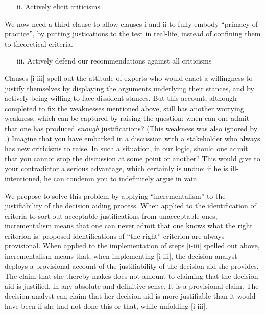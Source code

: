 \documentclass[preprint, french, english, 11pt, authoryear]{elsarticle}%
\begin{document}
\begin{itemize}
\item[ii.]	Actively elicit criticisms
\end{itemize}

We now need a third clause to allow clauses i and ii to fully embody “primacy of practice”, by putting justications to the test in real-life, instead of confining them to theoretical criteria.

\begin{itemize}
\item[iii.]	 Actively defend our recommendations against all criticisms
\end{itemize}

Clauses [i-iii] spell out the attitude of experts who would enact a willingness to justify themselves by displaying the arguments underlying their stances, and by actively being willing to face dissident stances. But this account, although completed to fix the weaknesses mentioned above, still has another worrying weakness, which can be captured by raising the question: when can one admit that one has produced \emph{enough} justifications? (This weakness was also ignored by  \citet{meinard_what_2017}.) Imagine that you have embarked in a discussion with a stakeholder who always has new criticisms to raise. In such a situation, in our logic, should one admit that you cannot stop the discussion at some point or another? This would give to your contradictor a serious advantage, which certainly is undue: if he is ill-intentioned, he can condemn you to indefinitely argue in vain.

We propose to solve this problem by applying ``incrementalism'' to the justifiability of the decision aiding process. When applied to the identification of criteria to sort out acceptable justifications from unacceptable ones, incrementalism means that one can never admit that one knows what the right criterion is: proposed identifications of ``the right'' criterion are always provisional. When applied to the implementation of steps [i-iii] spelled out above, incrementalism means that, when implementing [i-iii], the decision analyst deploys a provisional account of the justifiability of the decision aid she provides. The claim that she thereby makes does not amount to claiming that the decision aid is justified, in any absolute and definitive sense. It is a provisional claim. The decision analyst can claim that her decision aid is more justifiable than it would have been if she had not done this or that, while unfolding [i-iii].
\end{document}
